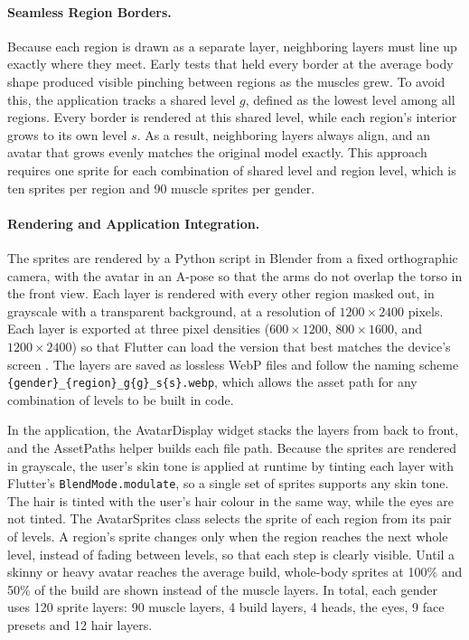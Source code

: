 \documentclass[11pt]{article}
\begin{document}
\paragraph{Seamless Region Borders.}
Because each region is drawn as a separate layer, neighboring layers must line up exactly where they meet. Early tests that held every border at the average body shape produced visible pinching between regions as the muscles grew. To avoid this, the application tracks a shared level $g$, defined as the lowest level among all regions. Every border is rendered at this shared level, while each region's interior grows to its own level $s$. As a result, neighboring layers always align, and an avatar that grows evenly matches the original model exactly. This approach requires one sprite for each combination of shared level and region level, which is ten sprites per region and 90 muscle sprites per gender.

\paragraph{Rendering and Application Integration.}
The sprites are rendered by a Python script in Blender from a fixed orthographic camera, with the avatar in an A-pose so that the arms do not overlap the torso in the front view. Each layer is rendered with every other region masked out, in grayscale with a transparent background, at a resolution of $1200 \times 2400$ pixels. Each layer is exported at three pixel densities ($600 \times 1200$, $800 \times 1600$, and $1200 \times 2400$) so that Flutter can load the version that best matches the device's screen \cite{flutterassets}. The layers are saved as lossless WebP files and follow the naming scheme \texttt{\{gender\}\_\{region\}\_g\{g\}\_s\{s\}.webp}, which allows the asset path for any combination of levels to be built in code.

In the application, the AvatarDisplay widget stacks the layers from back to front, and the AssetPaths helper builds each file path. Because the sprites are rendered in grayscale, the user's skin tone is applied at runtime by tinting each layer with Flutter's \texttt{BlendMode.modulate}, so a single set of sprites supports any skin tone. The hair is tinted with the user's hair colour in the same way, while the eyes are not tinted. The AvatarSprites class selects the sprite of each region from its pair of levels. A region's sprite changes only when the region reaches the next whole level, instead of fading between levels, so that each step is clearly visible. Until a skinny or heavy avatar reaches the average build, whole-body sprites at 100\% and 50\% of the build are shown instead of the muscle layers. In total, each gender uses 120 sprite layers: 90 muscle layers, 4 build layers, 4 heads, the eyes, 9 face presets and 12 hair layers.
\end{document}
